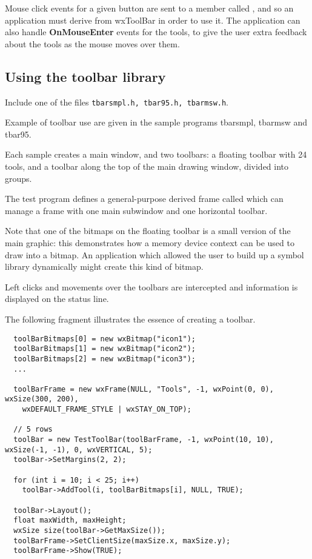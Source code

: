 Mouse click events for a given button are sent to a member called
, and so an application must derive from wxToolBar in order
to use it. The application can also handle {\bf OnMouseEnter} events for
the tools, to give the user extra feedback about the tools as the mouse
moves over them.

\subsection{Using the toolbar library}

Include one of the files {\tt tbarsmpl.h, tbar95.h, tbarmsw.h}.

Example of toolbar use are given in the sample programs tbarsmpl,
tbarmsw and tbar95.

Each sample creates a main window, and two toolbars: a floating toolbar
with 24 tools, and a toolbar along the top of the main drawing window, divided into groups.

The test program defines a general-purpose derived frame called
 which can manage a frame with one main subwindow
and one horizontal toolbar.

Note that one of the bitmaps on the floating toolbar is a small version of the
main graphic: this demonstrates how a memory device context can be used to
draw into a bitmap. An application which allowed the user to build up a symbol
library dynamically might create this kind of bitmap.

Left clicks and movements over the toolbars are intercepted and information
is displayed on the status line.

The following fragment illustrates the essence of creating a toolbar.

\begin{verbatim}
  toolBarBitmaps[0] = new wxBitmap("icon1");
  toolBarBitmaps[1] = new wxBitmap("icon2");
  toolBarBitmaps[2] = new wxBitmap("icon3");
  ...

  toolBarFrame = new wxFrame(NULL, "Tools", -1, wxPoint(0, 0), wxSize(300, 200),
    wxDEFAULT_FRAME_STYLE | wxSTAY_ON_TOP);

  // 5 rows
  toolBar = new TestToolBar(toolBarFrame, -1, wxPoint(10, 10), wxSize(-1, -1), 0, wxVERTICAL, 5);
  toolBar->SetMargins(2, 2);

  for (int i = 10; i < 25; i++)
    toolBar->AddTool(i, toolBarBitmaps[i], NULL, TRUE);

  toolBar->Layout();
  float maxWidth, maxHeight;
  wxSize size(toolBar->GetMaxSize());
  toolBarFrame->SetClientSize(maxSize.x, maxSize.y);
  toolBarFrame->Show(TRUE);
\end{verbatim}


